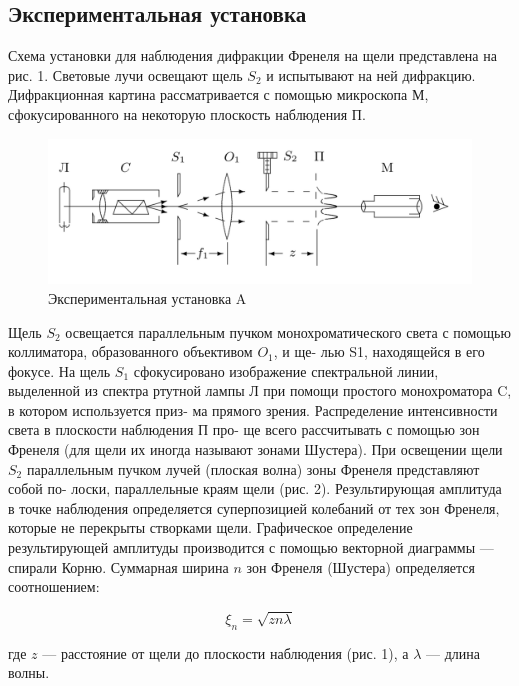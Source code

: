 \documentclass[15pt,a5paper,reqno]{article}
\begin{document}
	\subsection{Экспериментальная установка}
	
	Схема установки для наблюдения дифракции Френеля на щели
представлена на рис. 1. Световые лучи освещают щель $ S_2 $ и испытывают на ней дифракцию. Дифракционная картина рассматривается с помощью микроскопа М, сфокусированного на некоторую плоскость наблюдения П.
	
	\begin{figure}[h!]
		\centering
		\includegraphics[width=0.8\linewidth]{pics/a.png}
		\caption{Экспериментальная установка A}
		\label{labA}
	\end{figure}

Щель $ S_2 $ освещается параллельным пучком монохроматического
света с помощью коллиматора, образованного объективом $ O_1 $, и ще-
лью S1, находящейся в его фокусе. На щель $ S_1 $ сфокусировано изображение спектральной линии, выделенной из спектра ртутной лампы Л
при помощи простого монохроматора C, в котором используется приз-
ма прямого зрения.
Распределение интенсивности света в плоскости наблюдения П про-
ще всего рассчитывать с помощью зон Френеля (для щели их иногда
называют зонами Шустера). При освещении щели $ S_2 $ параллельным пучком лучей (плоская волна) зоны Френеля представляют собой по-
лоски, параллельные краям щели (рис. 2). Результирующая амплитуда
в точке наблюдения определяется суперпозицией колебаний от тех зон
Френеля, которые не перекрыты створками щели. Графическое определение результирующей амплитуды производится с помощью векторной
диаграммы --- спирали Корню. Суммарная ширина $ n $ зон Френеля (Шустера) определяется соотношением:

\begin{equation}\label{xin}
\xi_n = \sqrt{zn\lambda}
\end{equation}

где $ z $ --- расстояние от щели до плоскости наблюдения (рис. 1), а $ \lambda $ --- длина волны.
\end{document}
